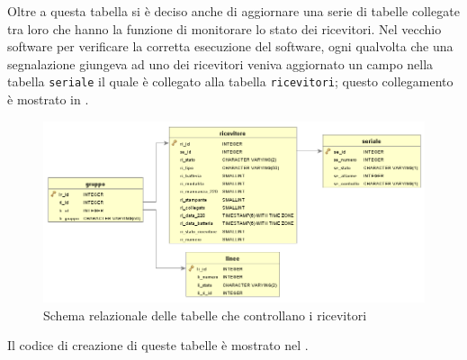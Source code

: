 Oltre a questa tabella si è deciso anche di aggiornare una serie di tabelle collegate tra loro che hanno la funzione di monitorare lo stato dei ricevitori. Nel vecchio software per verificare la corretta esecuzione del software, ogni qualvolta che una segnalazione giungeva ad uno dei ricevitori veniva aggiornato un campo nella tabella \texttt{seriale} il quale è collegato alla tabella \texttt{ricevitori}; questo collegamento è mostrato in .
\begin{figure}
	\centering
	\includegraphics[width=0.7\linewidth]{pictures/erricevitori.png}
	\caption{Schema relazionale delle tabelle che controllano i ricevitori}\label{fig:erricevitori}
\end{figure}
Il codice di creazione di queste tabelle è mostrato nel .

